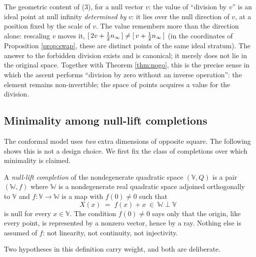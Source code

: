 \begin{remark}\label{rem:destination}
The geometric content of (3), for a null vector $v$: the value of ``division by $v$'' is an ideal point at null infinity \emph{determined by} $v$: it lies over the null direction of $v$, at a position fixed by the scale of $v$. The value remembers more than the direction alone: rescaling $v$ moves it, $[\,2v + \tfrac12n_\infty\,] \neq [\,v + \tfrac12n_\infty\,]$ (in the coordinates of Proposition \ref{prop:swap}, these are distinct points of the same ideal stratum). The answer to the forbidden division exists and is canonical; it merely does not lie in the original space. Together with Theorem \ref{thm:nogo}, this is the precise sense in which the ascent performs ``division by zero without an inverse operation'': the element remains non-invertible; the space of points acquires a value for the division.
\end{remark}

\subsection{Minimality among null-lift completions}\label{sec:minimality}

The conformal model uses \emph{two} extra dimensions of opposite square. The following shows this is not a design choice. We first fix the class of completions over which minimality is claimed.

\begin{definition}\label{def:nulllift}
A \emph{null-lift completion} of the nondegenerate quadratic space $(\mathbb{V}, Q)$ is a pair $(\mathbb{W}, f)$ where $\mathbb{W}$ is a nondegenerate real quadratic space adjoined orthogonally to $\mathbb{V}$ and $f : \mathbb{V} \to \mathbb{W}$ is a map with $f(0) \neq 0$ such that
\[
X(x) \;=\; f(x) + x \ \in\ \mathbb{W} \perp \mathbb{V}
\]
is null for every $x \in \mathbb{V}$. The condition $f(0) \neq 0$ says only that the origin, like every point, is represented by a nonzero vector, hence by a ray. Nothing else is assumed of $f$: not linearity, not continuity, not injectivity.
\end{definition}

Two hypotheses in this definition carry weight, and both are deliberate.

